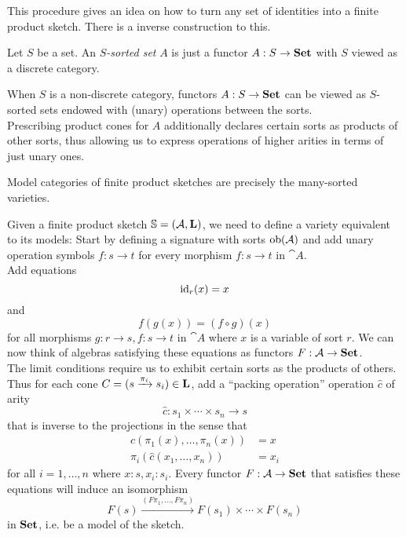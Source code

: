 This procedure gives an idea on how to turn any set of identities into a finite product sketch. There is a inverse construction to this.

\begin{Definition}
Let $S$ be a set. An \emph{$S$-sorted set} $A$ is just a functor $A : S \to \mathbf{Set}$ with $S$ viewed as a discrete category.
\end{Definition}

When $S$ is a non-discrete category, functors $A : S \to \mathbf{Set}$ can be viewed as $S$-sorted sets endowed with (unary) operations between the sorts. \\

Prescribing product cones for $A$ additionally declares certain sorts as products of other sorts, thus allowing us to express operations of higher arities in terms of just unary ones.
 
\begin{Proposition}\label{prop:modelsarevarieties}
Model categories of finite product sketches are precisely the many-sorted varieties.
\end{Proposition}
\begin{Proof}
Given a finite product sketch $\mathbb S = (\mathcal{A}, \textbf{L})$, we need to define a variety equivalent to its models: Start by defining a signature with sorts $\textrm{ob}(\mathcal{A})$ and add unary operation symbols $f : s \to t$ for every morphism $f : s \to t$ in $\cat A$. \\

Add equations
\[ \textrm{id}_r(x) = x \]
and
\[ f(g(x)) = (f \circ g)(x)  \]
for all morphisms $g : r \to s, f : s \to t$ in $\cat A$ where $x$ is a variable of sort $r$. We can now think of algebras satisfying these equations as functors $F : \mathcal{A} \to \mathbf{Set}$. \\

The limit conditions require us to exhibit certain sorts as the products of others. Thus for each cone $C = (s \xrightarrow{\pi_i} s_i) \in \textbf{L}$, add a ``packing operation'' operation $\hat c$ of arity
\[ \hat c : s_1 \times \cdots \times s_n \to s \]
that is inverse to the projections in the sense that
\begin{align*}
\hat c(\pi_1(x), \ldots, \pi_n(x)) &= x \\
\pi_i(\hat c(x_1, \ldots, x_n)) &= x_i
\end{align*}
for all $i=1,\ldots,n$ where $x : s, x_i : s_i$.
Every functor $F : \mathcal{A} \to \mathbf{Set}$ that satisfies these equations will induce an isomorphism
\[ F(s) \xrightarrow{(F\pi_1,\ldots, F\pi_n)} F(s_1) \times \cdots \times F(s_n) \]
in $\mathbf{Set}$, i.e. be a model of the sketch.
\end{Proof}

